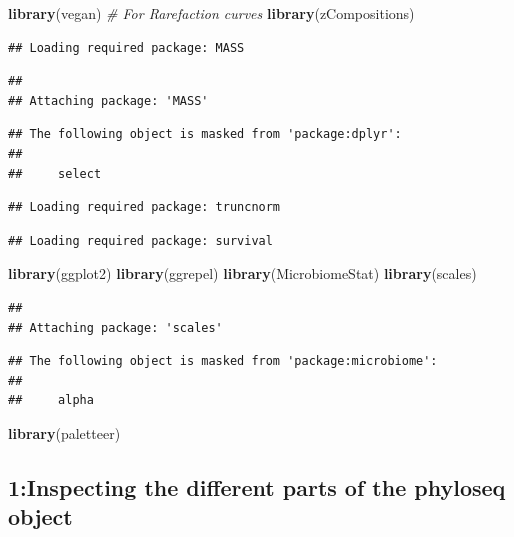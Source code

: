 \documentclass[
]{article}
\newenvironment{Shaded}{\begin{snugshade}}{\end{snugshade}}
\newcommand{\CommentTok}[1]{\textcolor[rgb]{0.56,0.35,0.01}{\textit{#1}}}
\newcommand{\FunctionTok}[1]{\textcolor[rgb]{0.13,0.29,0.53}{\textbf{#1}}}
\newcommand{\NormalTok}[1]{#1}
\begin{document}
\begin{Shaded}
\begin{Highlighting}[]
\FunctionTok{library}\NormalTok{(vegan)      }\CommentTok{\# For Rarefaction curves}
\FunctionTok{library}\NormalTok{(zCompositions)}
\end{Highlighting}
\end{Shaded}

\begin{verbatim}
## Loading required package: MASS
\end{verbatim}

\begin{verbatim}
## 
## Attaching package: 'MASS'
\end{verbatim}

\begin{verbatim}
## The following object is masked from 'package:dplyr':
## 
##     select
\end{verbatim}

\begin{verbatim}
## Loading required package: truncnorm
\end{verbatim}

\begin{verbatim}
## Loading required package: survival
\end{verbatim}

\begin{Shaded}
\begin{Highlighting}[]
\FunctionTok{library}\NormalTok{(ggplot2)}
\FunctionTok{library}\NormalTok{(ggrepel)}
\FunctionTok{library}\NormalTok{(MicrobiomeStat)}
\FunctionTok{library}\NormalTok{(scales)}
\end{Highlighting}
\end{Shaded}

\begin{verbatim}
## 
## Attaching package: 'scales'
\end{verbatim}

\begin{verbatim}
## The following object is masked from 'package:microbiome':
## 
##     alpha
\end{verbatim}

\begin{Shaded}
\begin{Highlighting}[]
\FunctionTok{library}\NormalTok{(paletteer)}
\end{Highlighting}
\end{Shaded}

\subsection{1:Inspecting the different parts of the phyloseq
object}\label{inspecting-the-different-parts-of-the-phyloseq-object}
\end{document}
